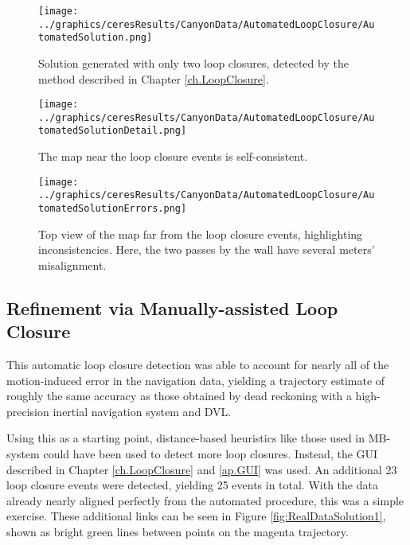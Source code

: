  \begin{figure}[!htb]
   \centering
   \texttt{[image: ../graphics/ceresResults/CanyonData/AutomatedLoopClosure/AutomatedSolution.png]} %
   \caption{Solution generated with only two loop closures, detected by the method described in Chapter \ref{ch.LoopClosure}.}
   \label{fig:AutoSol}
\end{figure}

 \begin{figure}[!htb]
   \centering
   \texttt{[image: ../graphics/ceresResults/CanyonData/AutomatedLoopClosure/AutomatedSolutionDetail.png]} %
   \caption{The map near the loop closure events is self-consistent.}
   \label{fig:AutoSol1}
\end{figure}

 \begin{figure}[!htb]
   \centering
   \texttt{[image: ../graphics/ceresResults/CanyonData/AutomatedLoopClosure/AutomatedSolutionErrors.png]} %
   \caption{Top view of the map far from the loop closure events, highlighting inconsistencies. Here, the two passes by the wall have several meters' misalignment.}
   \label{fig:AutoSol2}
\end{figure}

\subsection{Refinement via Manually-assisted Loop Closure}

This automatic loop closure detection was able to account for nearly all of the motion-induced error in the navigation data, yielding a trajectory estimate of roughly the same accuracy as those obtained by dead reckoning with a high-precision inertial navigation system and DVL. 

Using this as a starting point, distance-based heuristics like those used in MB-system \cite{Caress2006} could have been used to detect more loop closures. Instead, the GUI described in Chapter \ref{ch.LoopClosure} and \ref{ap.GUI} was used. An additional 23 loop closure events were detected, yielding 25 events in total. With the data already nearly aligned perfectly from the automated procedure, this was a simple exercise. These additional links can be seen in Figure \ref{fig:RealDataSolution1}, shown as bright green lines between points on the magenta trajectory.

